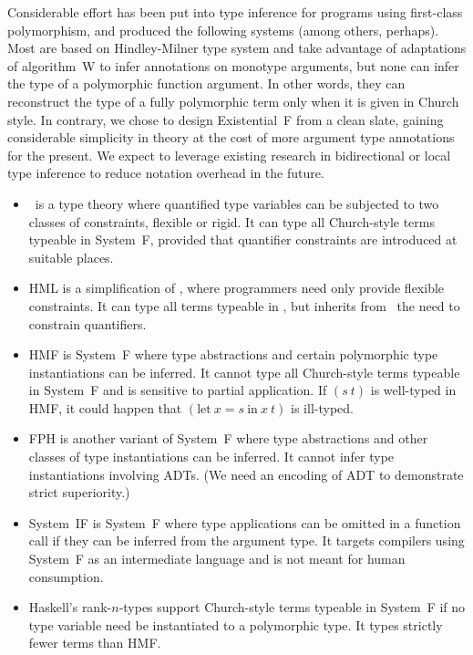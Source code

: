\documentclass{amsart}
\begin{document}
\nc{}

Considerable effort has been put into type inference for programs
using first-class polymorphism, and produced the following
systems (among others, perhaps). Most are based on Hindley-Milner
type system and take advantage of adaptations of algorithm~W to
infer annotations on monotype arguments, but none can infer the
type of a polymorphic function argument. In other words, they can
reconstruct the type of a fully polymorphic term only when it is
given in Church style. In contrary, we chose to design
Existential~F from a clean slate, gaining considerable simplicity
in theory at the cost of more argument type annotations for the
present. We expect to leverage existing research in bidirectional
or local type inference to reduce notation overhead in the
future.
\begin{itemize}
\item \MLF\ is a type theory where quantified type variables can
be subjected to two classes of constraints, flexible or rigid. It
can type all Church-style terms typeable in System~F, provided
that quantifier constraints are introduced at suitable places.

\item HML is a simplification of \MLF, where programmers need
only provide flexible constraints. It can type all terms typeable
in \MLF, but inherits from \MLF\ the need to constrain
quantifiers.

\item HMF is System~F where type abstractions and certain
polymorphic type instantiations can be inferred. It cannot type
all Church-style terms typeable in System~F and is sensitive to
partial application. If $(s~t)$ is well-typed in HMF, it could
happen that $(\mathrm{let}~x=s~\mathrm{in}~x~t)$ is ill-typed.


\item FPH is another variant of System~F where type abstractions
and other classes of type instantiations can be inferred. It
cannot infer type instantiations involving ADTs. (We need an
encoding of ADT to demonstrate strict superiority.)

\item System~IF is System~F where type applications can be
omitted in a function call if they can be inferred from the
argument type. It targets compilers using System~F as an
intermediate language and is not meant for human consumption.

\item Haskell's rank-$n$-types support Church-style terms
typeable in System~F if no type variable need be instantiated to
a polymorphic type. It types strictly fewer terms than HMF.
\end{itemize}
\end{document}
